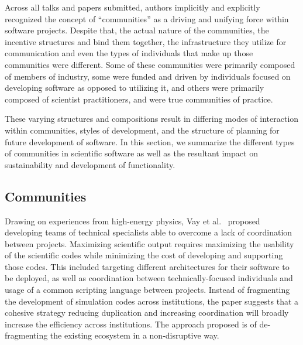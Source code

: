 \documentclass[11pt, oneside]{amsart}
\begin{document}
Across all talks and papers submitted, authors implicitly and
explicitly recognized the concept of ``communities'' as a driving and
unifying force within software projects.  Despite that, the actual
nature of the communities, the incentive structures and bind them
together, the infrastructure they utilize for communication and even
the types of individuals that make up those communities were
different.  Some of these communities were primarily composed of
members of industry, some were funded and driven by individuals
focused on developing software as opposed to utilizing it, and others
were primarily composed of scientist practitioners, and were true
communities of practice.

These varying structures and compositions result in differing modes of
interaction within communities, styles of development, and the
structure of planning for future development of software.  In this
section, we summarize the different types of communities in scientific
software as well as the resultant impact on sustainability and
development of functionality.

\subsection{Communities}


Drawing on experiences from high-energy physics, Vay et
al.~\cite{Vay_WSSSPE} proposed developing teams of technical
specialists able to overcome a lack of coordination between projects.
Maximizing scientific output requires maximizing the usability of the
scientific codes while minimizing the cost of developing and
supporting those codes.  This included targeting different
architectures for their software to be deployed, as well as
coordination between technically-focused individuals and usage of a
common scripting language between projects.  Instead of fragmenting
the development of simulation codes across institutions, the paper
suggests that a cohesive strategy reducing duplication and increasing
coordination will broadly increase the efficiency across institutions.
The approach proposed is of de-fragmenting the existing ecosystem in a
non-disruptive way.
\end{document}
